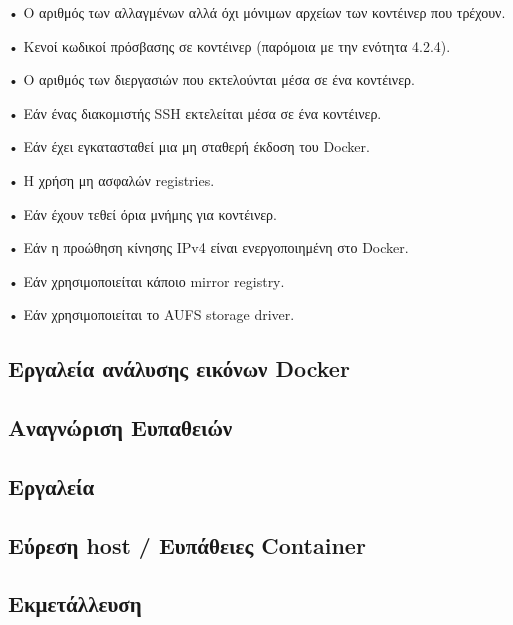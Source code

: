 • Ο αριθμός των αλλαγμένων αλλά όχι μόνιμων αρχείων των κοντέινερ που τρέχουν.

• Κενοί κωδικοί πρόσβασης σε κοντέινερ (παρόμοια με την ενότητα 4.2.4).

• Ο αριθμός των διεργασιών που εκτελούνται μέσα σε ένα κοντέινερ.

• Εάν ένας διακομιστής \textlatin{SSH} εκτελείται μέσα σε ένα κοντέινερ.

• Εάν έχει εγκατασταθεί μια μη σταθερή έκδοση του \textlatin{Docker}.

• Η χρήση μη ασφαλών \textlatin{registries}.

• Εάν έχουν τεθεί όρια μνήμης για κοντέινερ.

• Εάν η προώθηση κίνησης \textlatin{IPv4} είναι ενεργοποιημένη στο
\textlatin{Docker}.

• Εάν χρησιμοποιείται κάποιο \textlatin{mirror registry}.

• Εάν χρησιμοποιείται το \textlatin{AUFS storage driver}.

\subsection{Εργαλεία ανάλυσης εικόνων \textlatin{Docker}}

\subsection{Αναγνώριση Ευπαθειών}
\subsection{Εργαλεία}
\subsection{Εύρεση \textlatin{host} / Ευπάθειες \textlatin{Container}}
\subsection{Εκμετάλλευση}
